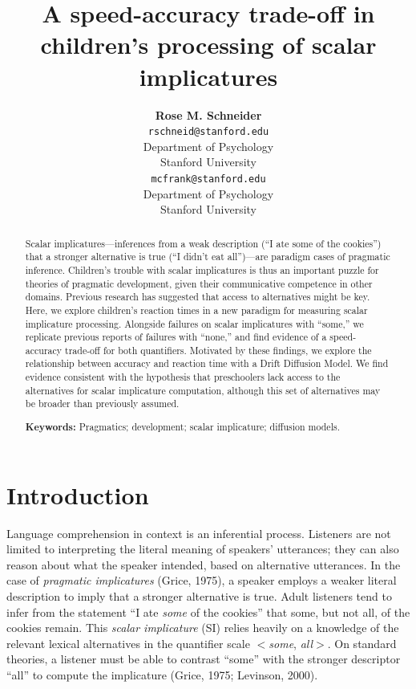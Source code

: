 \documentclass[10pt, letterpaper]{article}
\title{A speed-accuracy trade-off in children's processing of scalar
implicatures}
\author{{\large \bf Rose M. Schneider} \\ \texttt{rschneid@stanford.edu} \\ Department of Psychology \\ Stanford University \And {\large \bf Michael C. Frank} \\ \texttt{mcfrank@stanford.edu} \\ Department of Psychology \\ Stanford University}
\begin{document}
\maketitle

\begin{abstract}
Scalar implicatures---inferences from a weak description (``I ate some
of the cookies'') that a stronger alternative is true (``I didn't eat
all'')---are paradigm cases of pragmatic inference. Children's trouble
with scalar implicatures is thus an important puzzle for theories of
pragmatic development, given their communicative competence in other
domains. Previous research has suggested that access to alternatives
might be key. Here, we explore children's reaction times in a new
paradigm for measuring scalar implicature processing. Alongside failures
on scalar implicatures with ``some,'' we replicate previous reports of
failures with ``none,'' and find evidence of a speed-accuracy trade-off
for both quantifiers. Motivated by these findings, we explore the
relationship between accuracy and reaction time with a Drift Diffusion
Model. We find evidence consistent with the hypothesis that preschoolers
lack access to the alternatives for scalar implicature computation,
although this set of alternatives may be broader than previously
assumed.

\textbf{Keywords:}
Pragmatics; development; scalar implicature; diffusion models.
\end{abstract}

\section{Introduction}\label{introduction}

Language comprehension in context is an inferential process. Listeners
are not limited to interpreting the literal meaning of speakers'
utterances; they can also reason about what the speaker intended, based
on alternative utterances. In the case of \emph{pragmatic implicatures}
(Grice, 1975), a speaker employs a weaker literal description to imply
that a stronger alternative is true. Adult listeners tend to infer from
the statement ``I ate \emph{some} of the cookies'' that some, but not
all, of the cookies remain. This \emph{scalar implicature} (SI) relies
heavily on a knowledge of the relevant lexical alternatives in the
quantifier scale \(<\)\emph{some}, \emph{all}\(>\). On standard
theories, a listener must be able to contrast ``some'' with the stronger
descriptor ``all'' to compute the implicature (Grice, 1975; Levinson,
2000).
\end{document}
